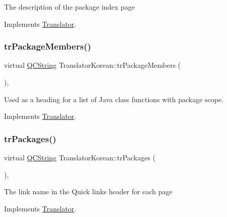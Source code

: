 The description of the package index page 

Implements \mbox{\hyperlink{class_translator}{Translator}}.

\mbox{\label{class_translator_korean_a819b222b40e70efaa83097b093e67ed5}} 
\subsubsection{\texorpdfstring{trPackageMembers()}{trPackageMembers()}}
{\footnotesize\ttfamily virtual \mbox{\hyperlink{class_q_c_string}{Q\+C\+String}} Translator\+Korean\+::tr\+Package\+Members (\begin{DoxyParamCaption}{ }\end{DoxyParamCaption})\hspace{0.3cm}{\ttfamily [inline]}, {\ttfamily [virtual]}}

Used as a heading for a list of Java class functions with package scope. 

Implements \mbox{\hyperlink{class_translator}{Translator}}.

\mbox{\label{class_translator_korean_ace3e33c1989ea0b200ecbcfcb69bb205}} 
\subsubsection{\texorpdfstring{trPackages()}{trPackages()}}
{\footnotesize\ttfamily virtual \mbox{\hyperlink{class_q_c_string}{Q\+C\+String}} Translator\+Korean\+::tr\+Packages (\begin{DoxyParamCaption}{ }\end{DoxyParamCaption})\hspace{0.3cm}{\ttfamily [inline]}, {\ttfamily [virtual]}}

The link name in the Quick links header for each page 

Implements \mbox{\hyperlink{class_translator}{Translator}}.

\mbox{\label{class_translator_korean_a4767bc3f094854d52d0426464d6008e4}} 
